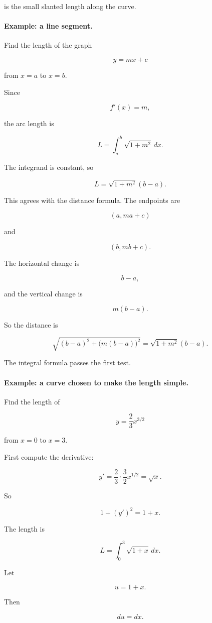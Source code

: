 is the small slanted length along the curve.

\paragraph{Example: a line segment.}
Find the length of the graph

\[
y=mx+c
\]

from \(x=a\) to \(x=b\).

Since

\[
f'(x)=m,
\]

the arc length is

\[
L=\int_a^b \sqrt{1+m^2}\,dx.
\]

The integrand is constant, so

\[
L=\sqrt{1+m^2}(b-a).
\]

This agrees with the distance formula.  The endpoints are

\[
(a,ma+c)
\]

and

\[
(b,mb+c).
\]

The horizontal change is

\[
b-a,
\]

and the vertical change is

\[
m(b-a).
\]

So the distance is

\[
\sqrt{(b-a)^2+\bigl(m(b-a)\bigr)^2}
=
\sqrt{1+m^2}(b-a).
\]

The integral formula passes the first test.

\paragraph{Example: a curve chosen to make the length simple.}
Find the length of

\[
y=\frac23 x^{3/2}
\]

from \(x=0\) to \(x=3\).

First compute the derivative:

\[
y'=\frac23\cdot\frac32 x^{1/2}=\sqrt{x}.
\]

So

\[
1+(y')^2=1+x.
\]

The length is

\[
L=\int_0^3 \sqrt{1+x}\,dx.
\]

Let

\[
u=1+x.
\]

Then

\[
du=dx.
\]

